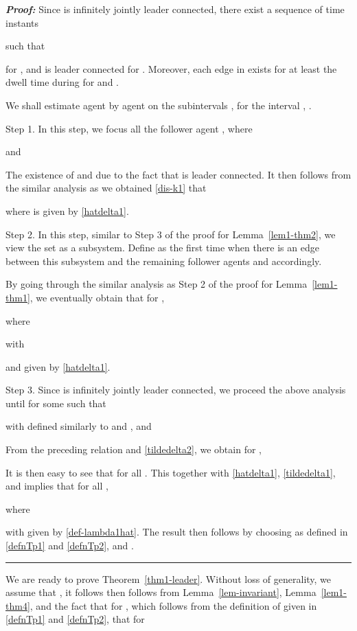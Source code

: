 \documentclass[a4paper, 11pt]{article}
\newenvironment{IEEEproof}[1][\bf Proof]{\smallskip\par\noindent\textit{#1: }}{\hspace*{\fill} \rule{6pt}{6pt}\smallskip}
\begin{document}
\begin{IEEEproof}
Since  is infinitely jointly leader connected, there exist a sequence of time instants

such that

for , and  is leader connected for .
Moreover, each edge in 
exists for at least the dwell time  during 
for  and .

We shall estimate  agent by agent on the subintervals , 
for the interval , .

\noindent Step 1. In this step, we focus all the follower agent , where

and

The existence of  and  due to the fact that  is leader connected.
It then follows from the similar analysis as we obtained \eqref{dis-k1} that

where  is given by \eqref{hatdelta1}.

\vspace*{2mm}

\noindent Step 2. In this step, similar to Step 3 of the proof for Lemma~\ref{lem1-thm2},
we view the set  as a subsystem. Define  as the first time when
there is an edge between this subsystem and the remaining follower agents and  accordingly.

By going through the similar analysis as Step 2 of the proof for Lemma~\ref{lem1-thm1},
we eventually obtain that for ,

where

with

and  given by \eqref{hatdelta1}.

\vspace*{2mm}

\noindent Step 3. Since  is infinitely jointly leader connected,
we proceed the above analysis until 
for some  such that

with  defined similarly to  and , and

From the preceding relation and \eqref{tildedelta2},
we obtain for ,

It is then easy to see that  for all .
This together with \eqref{hatdelta1}, \eqref{tildedelta1}, and  implies that for all  ,

where

with  given by \eqref{def-lambda1hat}.
The result then follows by choosing  as defined in \eqref{defnTp1} and \eqref{defnTp2},  and .
\end{IEEEproof}

We are ready to prove Theorem~\ref{thm1-leader}. Without loss of generality, we assume that , it follows then follows from Lemma~\ref{lem-invariant}, Lemma~\ref{lem1-thm4}, and the fact that
 for , which follows from the definition of  given in \eqref{defnTp1} and \eqref{defnTp2}, that for 
\end{document}
